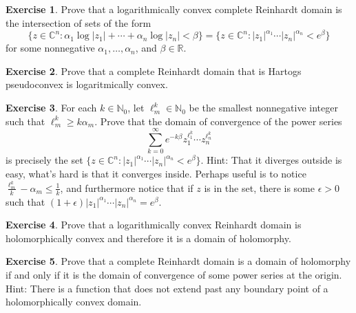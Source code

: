 \documentclass[12pt,openany]{book}
\newcommand{\sabs}[1]{\lvert {#1} \rvert}
\newcommand{\C}{{\mathbb{C}}}
\newcommand{\R}{{\mathbb{R}}}
\newcommand{\N}{{\mathbb{N}}}
\theoremstyle{plain}
\theoremstyle{remark}
\theoremstyle{definition}
\newenvironment{exbox}{%
    \def\FrameCommand{\vrule width 1pt \relax\hspace {10pt}}%
    \MakeFramed {\advance \hsize -\width \FrameRestore }%
}{%
    \endMakeFramed
}
\theoremstyle{exercise}
\newtheorem{exercise}{Exercise}[section]
\theoremstyle{example}
\begin{document}
\begin{exbox}
\begin{exercise}
Prove that a logarithmically convex complete Reinhardt domain
is the intersection of sets of the form
\begin{equation*}
\bigl\{ z \in \C^n : \alpha_1 \log \sabs{z_1} + \cdots + \alpha_n \log
\sabs{z_n} < \beta  \bigr\} 
=
\bigl\{ z \in \C^n : \sabs{z_1}^{\alpha_1} \cdots \sabs{z_n}^{\alpha_n}
< e^\beta \bigr\} 
\end{equation*}
for some nonnegative $\alpha_1,\ldots,\alpha_n$, and $\beta \in \R$.
\end{exercise}

\begin{exercise}
Prove that a complete Reinhardt domain that is Hartogs
pseudoconvex is logaritmically convex.
\end{exercise}

\begin{exercise}
For each $k \in \N_0$, let $\ell_m^k \in \N_0$ be the smallest nonnegative integer such that
$\ell_m^k \geq k \alpha_m$.
Prove that the domain of convergence of the power series
\begin{equation*}
\sum_{k=0}^\infty e^{-k\beta}
z_1^{\ell_1^k}
\cdots
z_n^{\ell_n^k}
\end{equation*}
is precisely the set
$\bigl\{ z \in \C^n :
\sabs{z_1}^{\alpha_1} \cdots \sabs{z_n}^{\alpha_n}
< e^\beta \bigr\}$.
Hint: That it diverges outside is easy, what's hard is that it converges
inside.  Perhaps useful is to notice
$\frac{\ell_m^k}{k}-\alpha_m \leq \frac{1}{k}$, and furthermore
notice that if $z$ is in the set, there is some $\epsilon > 0$ such that
$(1+\epsilon)\sabs{z_1}^{\alpha_1} \cdots \sabs{z_n}^{\alpha_n} =
e^{\beta}$.
\end{exercise}

\begin{exercise}
Prove that a logarithmically convex Reinhardt domain is holomorphically
convex and therefore it is a domain of holomorphy.
\end{exercise}

\begin{exercise}
Prove that a complete Reinhardt domain is
a domain of holomorphy if and only if it is the
domain of convergence of some power series at the origin.  Hint: There is a
function that does not extend past any boundary point of a holomorphically
convex domain.
\end{exercise}
\end{exbox}
\end{document}
